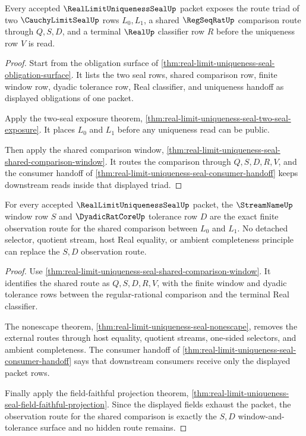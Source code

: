 \begin{theorem}
\label{thm:real-limit-uniqueness-seal-route-triad}
Every accepted $\RealLimitUniquenessSealUp$ packet exposes the route triad of two $\CauchyLimitSealUp$ rows $L_0,L_1$, a shared $\RegSeqRatUp$ comparison route through $Q,S,D$, and a terminal $\RealUp$ classifier row $R$ before the uniqueness row $V$ is read.
\end{theorem}
\begin{proof}
Start from the obligation surface of \autoref{thm:real-limit-uniqueness-seal-obligation-surface}. It lists the two seal rows, shared comparison row, finite window row, dyadic tolerance row, Real classifier, and uniqueness handoff as displayed obligations of one packet.

Apply the two-seal exposure theorem, \autoref{thm:real-limit-uniqueness-seal-two-seal-exposure}. It places $L_0$ and $L_1$ before any uniqueness read can be public.

Then apply the shared comparison window, \autoref{thm:real-limit-uniqueness-seal-shared-comparison-window}. It routes the comparison through $Q,S,D,R,V$, and the consumer handoff of \autoref{thm:real-limit-uniqueness-seal-consumer-handoff} keeps downstream reads inside that displayed triad.
\end{proof}

\begin{theorem}
\label{thm:real-limit-uniqueness-seal-window-exactness}
For every accepted $\RealLimitUniquenessSealUp$ packet, the $\StreamNameUp$ window row $S$ and $\DyadicRatCoreUp$ tolerance row $D$ are the exact finite observation route for the shared comparison between $L_0$ and $L_1$. No detached selector, quotient stream, host Real equality, or ambient completeness principle can replace the $S,D$ observation route.
\end{theorem}
\begin{proof}
Use \autoref{thm:real-limit-uniqueness-seal-shared-comparison-window}. It identifies the shared route as $Q,S,D,R,V$, with the finite window and dyadic tolerance rows between the regular-rational comparison and the terminal Real classifier.

The nonescape theorem, \autoref{thm:real-limit-uniqueness-seal-nonescape}, removes the external routes through host equality, quotient streams, one-sided selectors, and ambient completeness. The consumer handoff of \autoref{thm:real-limit-uniqueness-seal-consumer-handoff} says that downstream consumers receive only the displayed packet rows.

Finally apply the field-faithful projection theorem, \autoref{thm:real-limit-uniqueness-seal-field-faithful-projection}. Since the displayed fields exhaust the packet, the observation route for the shared comparison is exactly the $S,D$ window-and-tolerance surface and no hidden route remains.
\end{proof}

